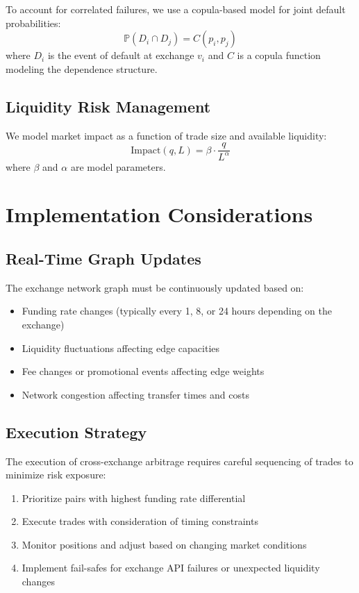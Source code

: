 \documentclass{article}
\begin{document}
To account for correlated failures, we use a copula-based model for joint default probabilities:
\begin{equation}
\mathbb{P}(D_i \cap D_j) = C(p_i, p_j)
\end{equation}
where $D_i$ is the event of default at exchange $v_i$ and $C$ is a copula function modeling the dependence structure.

\subsection{Liquidity Risk Management}

We model market impact as a function of trade size and available liquidity:
\begin{equation}
\text{Impact}(q, L) = \beta \cdot \frac{q}{L^{\alpha}}
\end{equation}
where $\beta$ and $\alpha$ are model parameters.

\section{Implementation Considerations}

\subsection{Real-Time Graph Updates}

The exchange network graph must be continuously updated based on:
\begin{itemize}
    \item Funding rate changes (typically every 1, 8, or 24 hours depending on the exchange)
    \item Liquidity fluctuations affecting edge capacities
    \item Fee changes or promotional events affecting edge weights
    \item Network congestion affecting transfer times and costs
\end{itemize}

\subsection{Execution Strategy}

The execution of cross-exchange arbitrage requires careful sequencing of trades to minimize risk exposure:
\begin{enumerate}
    \item Prioritize pairs with highest funding rate differential
    \item Execute trades with consideration of timing constraints
    \item Monitor positions and adjust based on changing market conditions
    \item Implement fail-safes for exchange API failures or unexpected liquidity changes
\end{enumerate}
\end{document}
